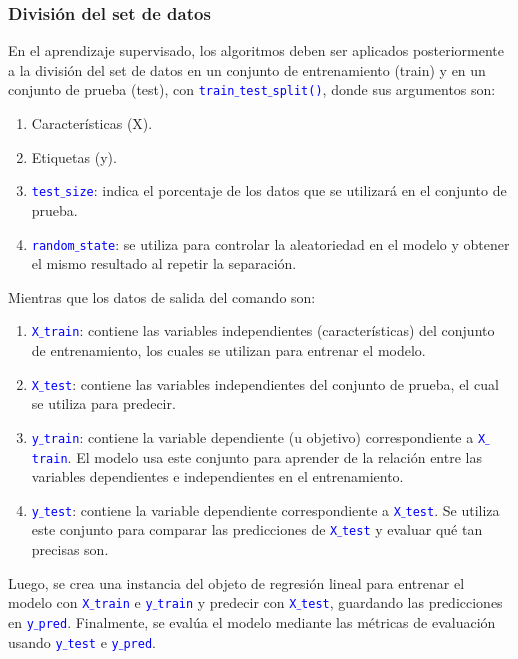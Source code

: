 \documentclass[a4paper, 12pt]{book}
\begin{document}
\subsubsection{División del set de datos}
En el aprendizaje supervisado, los algoritmos deben ser aplicados posteriormente a la división del set de datos en un conjunto de entrenamiento (train) y en un conjunto de prueba (test), con \texttt{\textcolor{blue}{train$\_$test$\_$split()}}, donde sus argumentos son:
\begin{enumerate}
	\item Características (X).
	\item Etiquetas (y).
	\item \texttt{\textcolor{blue}{test$\_$size}}: indica el porcentaje de los datos que se utilizará en el conjunto de prueba.
	\item \texttt{\textcolor{blue}{random$\_$state}}: se utiliza para controlar la aleatoriedad en el modelo y obtener el mismo resultado al repetir la separación.
\end{enumerate}
Mientras que los datos de salida del comando son:
\begin{enumerate}
	\item \texttt{\textcolor{blue}{X$\_$train}}: contiene las variables independientes (características) del conjunto de entrenamiento, los cuales se utilizan para entrenar el modelo.
	\item \texttt{\textcolor{blue}{X$\_$test}}: contiene las variables independientes del conjunto de prueba, el cual se utiliza para predecir.
	\item \texttt{\textcolor{blue}{y$\_$train}}: contiene la variable dependiente (u objetivo) correspondiente a \texttt{\textcolor{blue}{X$\_$train}}. El modelo usa este conjunto para aprender de la relación entre las variables dependientes e independientes en el entrenamiento.
	\item \texttt{\textcolor{blue}{y$\_$test}}: contiene la variable dependiente correspondiente a \texttt{\textcolor{blue}{X$\_$test}}. Se utiliza este conjunto para comparar las predicciones de \texttt{\textcolor{blue}{X$\_$test}} y evaluar qué tan precisas son.
\end{enumerate}
Luego, se crea una instancia del objeto de regresión lineal para entrenar el modelo con \texttt{\textcolor{blue}{X$\_$train}} e \texttt{\textcolor{blue}{y$\_$train}} y predecir con \texttt{\textcolor{blue}{X$\_$test}}, guardando las predicciones en \texttt{\textcolor{blue}{y$\_$pred}}. Finalmente, se evalúa el modelo mediante las métricas de evaluación usando \texttt{\textcolor{blue}{y$\_$test}} e \texttt{\textcolor{blue}{y$\_$pred}}.
\end{document}

